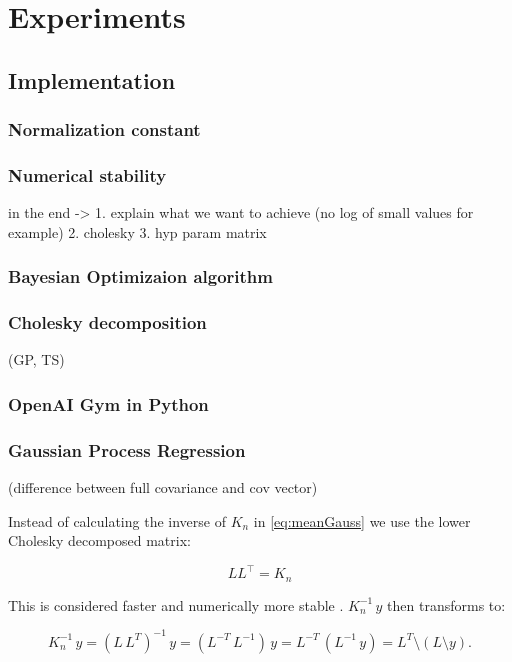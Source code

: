 \chapter{Experiments}
\label{chap:3}
%

\section{Implementation}

\subsection{Normalization constant}

\subsection{Numerical stability}
in the end -> 1. explain what we want to achieve (no log of small values for example)
2. cholesky
3. hyp param matrix

\subsection{Bayesian Optimizaion algorithm}

\subsection{Cholesky decomposition}
(GP, TS)

\subsection{OpenAI Gym in Python}

\subsection{Gaussian Process Regression}

(difference between full covariance and cov vector)

Instead of calculating the inverse of $K_n$ in \eqref{eq:meanGauss} we use the lower Cholesky decomposed matrix:

$$LL^\top=K_n$$

This is considered faster and numerically more stable \cite{rasmussen2006gaussian}. $K_n^{-1}\,y$ then transforms to:

\begin{equation} \label{eq:regression}
    K_n^{-1}\,y = (L\,L^{T})^{-1}\,y = (L^{-T}\,L^{-1})\,y = L^{-T}\,(L^{-1}\,y) = L^{T}\setminus(L \setminus y).
\end{equation}

